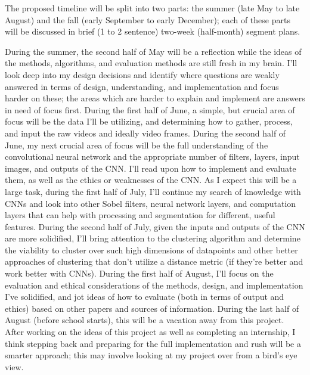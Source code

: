 \documentclass[10pt,twocolumn]{article}
\begin{document}
The proposed timeline will be split into two parts: the summer (late May to late August) and the fall (early September to early December); each of these parts will be discussed in brief (1 to 2 sentence) two-week (half-month) segment plans.

During the summer, the second half of May will be a reflection while the ideas of the methods, algorithms, and evaluation methods are still fresh in my brain. I'll look deep into my design decisions and identify where questions are weakly answered in terms of design, understanding, and implementation and focus harder on these; the areas which are harder to explain and implement are answers in need of focus first. During the first half of June, a simple, but crucial area of focus will be the data I'll be utilizing, and determining how to gather, process, and input the raw videos and ideally video frames. During the second half of June, my next crucial area of focus will be the full understanding of the convolutional neural network and the appropriate number of filters, layers, input images, and outputs of the CNN. I'll read upon how to implement and evaluate them, as well as the ethics or weaknesses of the CNN. As I expect this will be a large task, during the first half of July, I'll continue my search of knowledge with CNNs and look into other Sobel filters, neural network layers, and computation layers that can help with processing and segmentation for different, useful features. During the second half of July, given the inputs and outputs of the CNN are more solidified, I'll bring attention to the clustering algorithm and determine the viability to cluster over such high dimensions of datapoints and other better approaches of clustering that don't utilize a distance metric (if they're better and work better with CNNs). During the first half of August, I'll focus on the evaluation and ethical considerations of the methods, design, and implementation I've solidified, and jot ideas of how to evaluate (both in terms of output and ethics) based on other papers and sources of information. During the last half of August (before school starts), this will be a vacation away from this project. After working on the ideas of this project as well as completing an internship, I think stepping back and preparing for the full implementation and rush will be a smarter approach; this may involve looking at my project over from a bird's eye view. 

\end{document}
